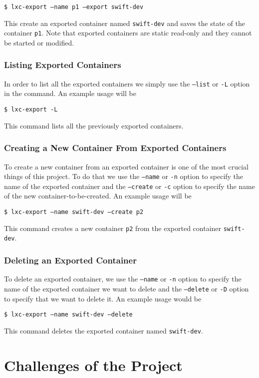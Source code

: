 \documentclass[12pt]{article}
\begin{document}
\texttt{\$ lxc-export --name p1 --export swift-dev}

\noindent This create an exported container named \texttt{swift-dev} and saves the state of the container \texttt{p1}. Note that exported containers are static read-only and they cannot be started or modified.

\subsubsection{Listing Exported Containers}

In order to list all the exported containers we simply use the \texttt{--list} or \texttt{-L} option in the command. An example usage will be

\texttt{\$ lxc-export -L}

\noindent This command lists all the previously exported containers.

\subsubsection{Creating a New Container From Exported Containers}

To create a new container from an exported container is one of the most crucial things of this project. To do that we use the \texttt{--name} or \texttt{-n} option to specify the name of the exported container and the \texttt{--create} or \texttt{-c} option to specify the name of the new container-to-be-created. An example usage will be

\texttt{\$ lxc-export --name swift-dev --create p2}

\noindent This command creates a new container \texttt{p2} from the exported container \texttt{swift-dev}.

\subsubsection{Deleting an Exported Container}

To delete an exported container, we use the \texttt{--name} or \texttt{-n} option to specify the name of the exported container we want to delete and the \texttt{--delete} or \texttt{-D} option to specify that we want to delete it. An example usage would be

\texttt{\$ lxc-export --name swift-dev --delete}

\noindent This command deletes the exported container named \texttt{swift-dev}.

\section{Challenges of the Project}
\end{document}
